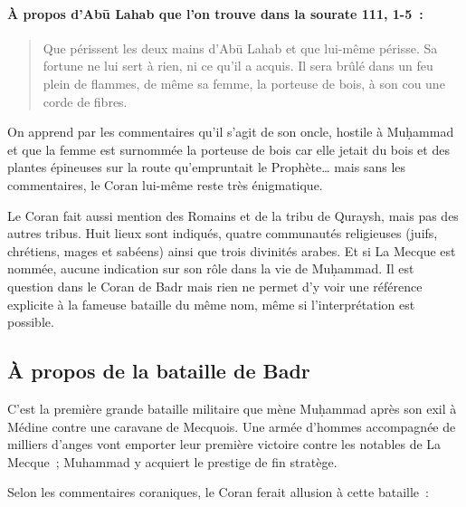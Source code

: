 \paragraph{À propos d'Abū Lahab que l'on trouve dans la sourate 111, 1-5~: }
\begin{quote}
    Que périssent les deux mains d'Abū Lahab
et que lui-même périsse. Sa fortune ne lui sert à rien, ni ce qu'il a
acquis. Il sera brûlé dans un feu plein de flammes, de même sa femme, la
porteuse de bois, à son cou une corde de fibres.
\end{quote}


On apprend par les commentaires qu'il
s'agit de son oncle, hostile à Muḥammad et que la femme est surnommée la
porteuse de bois car elle jetait du bois et des plantes épineuses sur la
route qu'empruntait le Prophète\ldots{} mais sans les commentaires, le
Coran lui-même reste très énigmatique.


Le Coran fait aussi mention des Romains et de la tribu de Quraysh, mais
pas des autres tribus. Huit lieux sont indiqués, quatre communautés
religieuses (juifs, chrétiens, mages et sabéens) ainsi que trois
divinités arabes. Et si La Mecque est nommée, aucune indication sur son
rôle dans la vie de Muḥammad. Il est question dans le Coran de Badr mais
rien ne permet d'y voir une référence explicite à la fameuse bataille du
même nom, même si l'interprétation est possible.

 
\subsection{À propos de la bataille de
Badr} 

C'est la première grande bataille militaire que mène Muḥammad après son
exil à Médine contre une caravane de Mecquois. Une armée d'hommes
accompagnée de milliers d'anges vont emporter leur première victoire
contre les notables de La Mecque~; Muhammad y acquiert le prestige de
fin stratège.

Selon les commentaires coraniques, le Coran ferait allusion à cette
bataille~:





